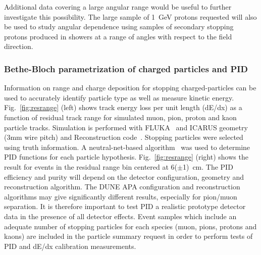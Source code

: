 Additional data covering a large angular range would be useful to further investigate this possibility.
The large sample of 1~GeV protons requested will also be used to study angular dependence using 
samples of secondary stopping protons produced in showers at a range of angles with
respect to the field direction.

\subsubsection{Bethe-Bloch parametrization of charged particles and PID}

%
\label{detbeam_pid}


Information on range and charge deposition for stopping charged-particles can be used to 
accurately identify particle type as well as measure kinetic energy. 
Fig.~\ref{fig:resrange}  (left) shows track energy loss per unit length (dE/dx) as a function of residual 
track range for simulated muon, pion, proton and kaon particle tracks.  Simulation is performed with
FLUKA~\cite{fluka05} and ICARUS geometry (3mm wire pitch) and Reconstruction code~\cite{icarus_reco}.
Stopping particles were selected using truth information.
A neutral-net-based algorithm~\cite{nn_pid,rd_pid}
was used to determine PID functions for each particle hypothesis.
Fig.~\ref{fig:resrange} (right) shows the result for events in the residual range bin centered at 6($\pm$1)~cm.
The PID efficiency and purity will  depend on the detector configuration, geometry and 
reconstruction algorithm. The DUNE APA configuration and reconstruction algorithms
may give significantly different results, especially for pion/muon separation. 
It is therefore important to test PID a realistic prototype detector
data in the presence of all detector effects.
Event samples which include an adequate number of stopping particles for each species
(muon, pions, protons and kaons) are included in the particle summary request in order to 
perform tests of PID and dE/dx calibration measurements.


